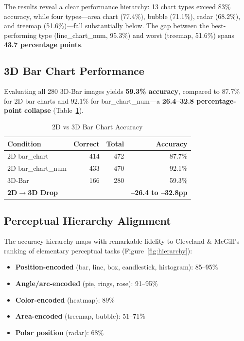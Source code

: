 \documentclass[sigconf, 10pt]{acmart}
\begin{document}
The results reveal a clear performance hierarchy: 13 chart types exceed 83\% accuracy, while four types---area chart (77.4\%), bubble (71.1\%), radar (68.2\%), and treemap (51.6\%)---fall substantially below. The gap between the best-performing type (line\_chart\_num, 95.3\%) and worst (treemap, 51.6\%) spans \textbf{43.7 percentage points}.

\subsection{3D Bar Chart Performance}
Evaluating all 280 3D-Bar images yields \textbf{59.3\% accuracy}, compared to 87.7\% for 2D bar charts and 92.1\% for bar\_chart\_num---a \textbf{26.4--32.8 percentage-point collapse} (Table~\ref{tab:3d}).

\begin{table}[h]
\caption{2D vs 3D Bar Chart Accuracy}
\label{tab:3d}
\small
\begin{tabular}{lrrr}
\toprule
\textbf{Condition} & \textbf{Correct} & \textbf{Total} & \textbf{Accuracy} \\
\midrule
2D bar\_chart & 414 & 472 & 87.7\% \\
2D bar\_chart\_num & 433 & 470 & 92.1\% \\
3D-Bar & 166 & 280 & 59.3\% \\
\midrule
\textbf{2D$\rightarrow$3D Drop} & & & \textbf{--26.4 to --32.8pp} \\
\bottomrule
\end{tabular}
\end{table}

\subsection{Perceptual Hierarchy Alignment}
The accuracy hierarchy maps with remarkable fidelity to Cleveland \& McGill's~\cite{cleveland1984} ranking of elementary perceptual tasks (Figure~\ref{fig:hierarchy}):

\begin{itemize}
    \item \textbf{Position-encoded} (bar, line, box, candlestick, histogram): 85--95\%
    \item \textbf{Angle/arc-encoded} (pie, rings, rose): 91--95\%
    \item \textbf{Color-encoded} (heatmap): 89\%
    \item \textbf{Area-encoded} (treemap, bubble): 51--71\%
    \item \textbf{Polar position} (radar): 68\%
\end{itemize}
\end{document}
